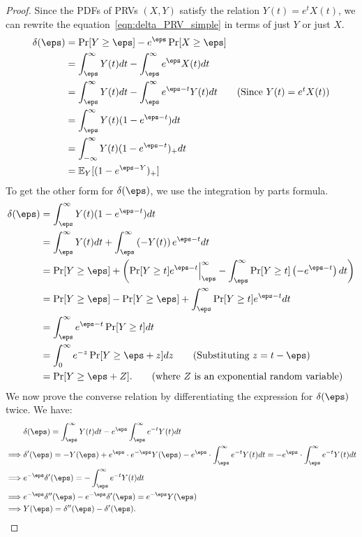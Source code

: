 {\renewcommand\footnote[1]{}\PRVprivacycurve*}
\begin{proof}	
Since the PDFs of PRVs $(X,Y)$ satisfy the relation $Y(t)=e^tX(t)$, we can rewrite the equation~\ref{eqn:delta_PRV_simple} in terms of just $Y$ or just $X$.
		\begin{align*}
		\delta(\eps)&=\Pr[Y\ge \eps]-e^\eps \Pr[X\ge \eps]\\
		&=\int_\eps^\infty Y(t) dt - \int_\eps^\infty e^\eps X(t) dt\\
		&=\int_\eps^\infty Y(t) dt - \int_\eps^\infty e^{\eps-t} Y(t) dt \tag{Since $Y(t)=e^tX(t)$}\\
		&=\int_\eps^\infty Y(t) (1-e^{\eps-t}) dt\\
		&=\int_{-\infty}^\infty Y(t) (1-e^{\eps-t})_+ dt\\
		&=\E_Y[(1-e^{\eps-Y})_+]
	\end{align*}
	To get the other form for $\delta(\eps)$, we use the integration by parts formula.
	\begin{align*}
		\delta(\eps)&=\int_{\eps}^\infty Y(t) (1-e^{\eps-t}) dt\\
		&=\int_{\eps}^\infty Y(t) dt + \int_{\eps}^\infty \lp -Y(t) \rp e^{\eps-t} dt\\
		&=\Pr[Y\ge \eps] + \lp \Pr[Y\ge t]e^{\eps-t}\Big|_\eps^\infty - \int_{\eps}^\infty \Pr[Y\ge t] \lp -e^{\eps-t}\rp dt \rp\\
		&=\Pr[Y\ge \eps] - \Pr[Y\ge \eps] + \int_{\eps}^\infty \Pr[Y\ge t] e^{\eps-t} dt\\
		&=\int_\eps^\infty e^{\eps-t} \Pr[Y\ge t] dt \\
		&=\int_0^\infty e^{-z} \Pr[Y\ge \eps+z] dz  \tag{Substituting $z=t-\eps$}\\
		&=\Pr[Y\ge \eps+Z]. \tag{where $Z$ is an exponential random variable}
	\end{align*}
We now prove the converse relation by differentiating the expression for $\delta(\eps)$ twice. We have:
	\begin{align*}
 	&\delta(\eps)=\int_\eps^\infty Y(t) dt - e^{\eps}\int_\eps^\infty e^{-t} Y(t) dt\\
	\implies & \delta'(\eps)=-Y(\eps)+e^{\eps}\cdot e^{-\eps}Y(\eps)-e^{\eps}\cdot \int_\eps^\infty e^{-t} Y(t) dt = -e^{\eps}\cdot \int_\eps^\infty e^{-t} Y(t) dt \\
	\implies & e^{-\eps}\delta'(\eps)=-\int_\eps^\infty e^{-t} Y(t) dt \\
	\implies & e^{-\eps}\delta''(\eps)-e^{-\eps}\delta'(\eps)=e^{-\eps} Y(\eps) \\
	\implies & Y(\eps)=\delta''(\eps)-\delta'(\eps).
	\end{align*}


\end{proof}




